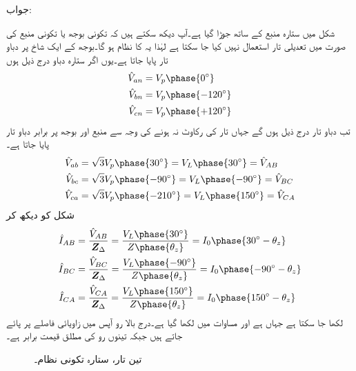 جواب:

شکل  میں ستارہ منبع کے ساتھ  جوڑا گیا ہے۔آپ دیکھ سکتے ہیں کہ تکونی بوجھ یا تکونی منبع کی صورت میں تعدیلی تار استعمال نہیں کیا جا سکتا ہے لہٰذا یہ  کا نظام ہو گا۔بوجھ کے ایک شاخ پر دباو تار پایا جاتا ہے۔یوں اگر ستارہ دباو درج ذیل ہوں
\begin{align*}
\hat{V}_{an}&=V_p\phase{0^{\circ}}\\
\hat{V}_{bn}&=V_p\phase{-120^{\circ}}\\
\hat{V}_{cn}&=V_p\phase{+120^{\circ}}
\end{align*}
تب دباو تار درج ذیل ہوں گے جہاں تار کی رکاوٹ نہ ہونے کی وجہ سے منبع اور بوجھ پر برابر دباو تار پایا جاتا ہے۔
\begin{align*}
\hat{V}_{ab}&=\sqrt{3}V_p\phase{30^{\circ}}=V_L\phase{30^{\circ}}=\hat{V}_{AB}\\
\hat{V}_{bc}&=\sqrt{3}V_p\phase{-90^{\circ}}=V_L\phase{-90^{\circ}}=\hat{V}_{BC}\\
\hat{V}_{ca}&=\sqrt{3}V_p\phase{-210^{\circ}}=V_L\phase{150^{\circ}}=\hat{V}_{CA}
\end{align*}
شکل  کو دیکھ کر 
\begin{align*}
\hat{I}_{AB}&=\frac{\hat{V}_{AB}}{\bZ_{\Delta}}=\frac{V_L\phase{30^{\circ}}}{Z\phase{\theta_z}}=I_0\phase{30^{\circ}-\theta_z}\\
\hat{I}_{BC}&=\frac{\hat{V}_{BC}}{\bZ_{\Delta}}=\frac{V_L\phase{-90^{\circ}}}{Z\phase{\theta_z}}=I_0\phase{-90^{\circ}-\theta_z}\\
\hat{I}_{CA}&=\frac{\hat{V}_{CA}}{\bZ_{\Delta}}=\frac{V_L\phase{150^{\circ}}}{Z\phase{\theta_z}}=I_0\phase{150^{\circ}-\theta_z}
\end{align*}
لکھا جا سکتا ہے جہاں  ہے اور مساوات میں  لکھا گیا ہے۔درج بالا رو آپس میں  زاویائی فاصلے پر پائے جاتے ہیں جبکہ تینوں رو کی مطلق قیمت برابر ہے۔
\begin{figure}
\centering
{}
\caption{تین تار، ستارہ تکونی نظام۔}
\label{شکل_تین_دوری_ستارہ_تکونی_الف}
\end{figure}
